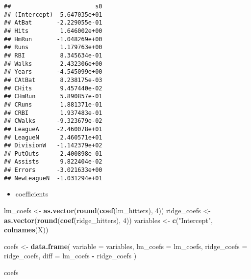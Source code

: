 \documentclass[
]{article}
\newenvironment{Shaded}{\begin{snugshade}}{\end{snugshade}}
\newcommand{\AttributeTok}[1]{\textcolor[rgb]{0.13,0.29,0.53}{#1}}
\newcommand{\DecValTok}[1]{\textcolor[rgb]{0.00,0.00,0.81}{#1}}
\newcommand{\FunctionTok}[1]{\textcolor[rgb]{0.13,0.29,0.53}{\textbf{#1}}}
\newcommand{\NormalTok}[1]{#1}
\newcommand{\OtherTok}[1]{\textcolor[rgb]{0.56,0.35,0.01}{#1}}
\newcommand{\SpecialCharTok}[1]{\textcolor[rgb]{0.81,0.36,0.00}{\textbf{#1}}}
\newcommand{\StringTok}[1]{\textcolor[rgb]{0.31,0.60,0.02}{#1}}
\providecommand{\tightlist}{%
  \setlength{\itemsep}{0pt}\setlength{\parskip}{0pt}}
\begin{document}
\begin{verbatim}
##                        s0
## (Intercept)  5.647035e+01
## AtBat       -2.229055e-01
## Hits         1.646002e+00
## HmRun       -1.048269e+00
## Runs         1.179763e+00
## RBI          8.345634e-01
## Walks        2.432306e+00
## Years       -4.545099e+00
## CAtBat       8.238175e-03
## CHits        9.457440e-02
## CHmRun       5.890857e-01
## CRuns        1.881371e-01
## CRBI         1.937483e-01
## CWalks      -9.323679e-02
## LeagueA     -2.460078e+01
## LeagueN      2.460571e+01
## DivisionW   -1.142379e+02
## PutOuts      2.400898e-01
## Assists      9.822404e-02
## Errors      -3.021633e+00
## NewLeagueN  -1.031294e+01
\end{verbatim}

\begin{itemize}
\tightlist
\item
  coefficients
\end{itemize}

\begin{Shaded}
\begin{Highlighting}[]
\NormalTok{lm\_coefs }\OtherTok{\textless{}{-}} \FunctionTok{as.vector}\NormalTok{(}\FunctionTok{round}\NormalTok{(}\FunctionTok{coef}\NormalTok{(lm\_hitters), }\DecValTok{4}\NormalTok{))}
\NormalTok{ridge\_coefs }\OtherTok{\textless{}{-}} \FunctionTok{as.vector}\NormalTok{(}\FunctionTok{round}\NormalTok{(}\FunctionTok{coef}\NormalTok{(ridge\_hitters), }\DecValTok{4}\NormalTok{))}
\NormalTok{variables }\OtherTok{\textless{}{-}} \FunctionTok{c}\NormalTok{(}\StringTok{"Intercept"}\NormalTok{, }\FunctionTok{colnames}\NormalTok{(X))}

\NormalTok{coefs }\OtherTok{\textless{}{-}} \FunctionTok{data.frame}\NormalTok{(}
  \AttributeTok{variable =}\NormalTok{ variables,}
  \AttributeTok{lm\_coefs =}\NormalTok{ lm\_coefs,}
  \AttributeTok{ridge\_coefs =}\NormalTok{ ridge\_coefs,}
  \AttributeTok{diff =}\NormalTok{ lm\_coefs }\SpecialCharTok{{-}}\NormalTok{ ridge\_coefs}
\NormalTok{)}

\NormalTok{coefs}
\end{Highlighting}
\end{Shaded}
\end{document}
